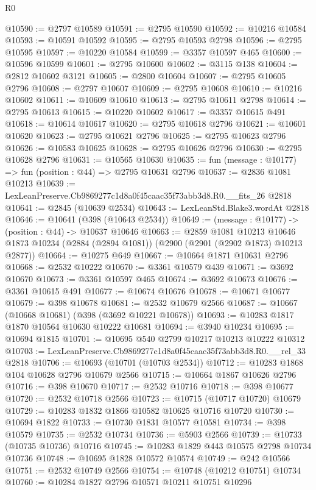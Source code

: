 \begin{lexlean}{R0}
\begin{coremodule}
@10590 := @2797 @10589
@10591 := @2795 @10590
@10592 := @10216 @10584
@10593 := @10591 @10592
@10595 := @2795 @10593 @2798
@10596 := @2795 @10595
@10597 := @10220 @10584
@10599 := @3357 @10597 @465
@10600 := @10596 @10599
@10601 := @2795 @10600
@10602 := @3115 @138
@10604 := @2812 @10602 @3121
@10605 := @2800 @10604
@10607 := @2795 @10605 @2796
@10608 := @2797 @10607
@10609 := @2795 @10608
@10610 := @10216 @10602
@10611 := @10609 @10610
@10613 := @2795 @10611 @2798
@10614 := @2795 @10613
@10615 := @10220 @10602
@10617 := @3357 @10615 @491
@10618 := @10614 @10617
@10620 := @2795 @10618 @2796
@10621 := @10601 @10620
@10623 := @2795 @10621 @2796
@10625 := @2795 @10623 @2796
@10626 := @10583 @10625
@10628 := @2795 @10626 @2796
@10630 := @2795 @10628 @2796
@10631 := @10565 @10630
@10635 := fun (message : @10177) => fun (position : @44) => @2795 @10631 @2796
@10637 := @2836 @1081 @10213
@10639 := LexLeanPreserve.Cb9869277c1d8a0f45caac35f73abb3d8.R0.__fits_26 @2818
@10641 := @2845 (@10639 @2534)
@10643 := LexLeanStd.Blake3.wordAt @2818
@10646 := @10641 (@398 (@10643 @2534))
@10649 := (message : @10177) -> (position : @44) -> @10637 @10646
@10663 := @2859
    @1081
    @10213
    @10646
    @1873
    @10234
    (@2884 (@2894 @1081))
    (@2900 (@2901 (@2902 @1873) @10213 @2877))
@10664 := @10275 @649
@10667 := @10664 @1871 @10631 @2796
@10668 := @2532 @10222
@10670 := @3361 @10579 @439
@10671 := @3692 @10670
@10673 := @3361 @10597 @465
@10674 := @3692 @10673
@10676 := @3361 @10615 @491
@10677 := @10674 @10676
@10678 := @10671 @10677
@10679 := @398 @10678
@10681 := @2532 @10679 @2566
@10687 := @10667 (@10668 @10681) (@398 (@3692 @10221 @10678))
@10693 := @10283 @1817 @1870 @10564 @10630 @10222 @10681
@10694 := @3940 @10234
@10695 := @10694 @1815
@10701 := @10695 @540 @2799 @10217 @10213 @10222 @10312
@10703 := LexLeanPreserve.Cb9869277c1d8a0f45caac35f73abb3d8.R0.__rel_33 @2818
@10706 := @10693 (@10701 (@10703 @2534))
@10712 := @10283 @1868 @104 @10628 @2796 @10679 @2566
@10715 := @10664 @1867 @10626 @2796
@10716 := @398 @10670
@10717 := @2532 @10716
@10718 := @398 @10677
@10720 := @2532 @10718 @2566
@10723 := @10715 (@10717 @10720) @10679
@10729 := @10283 @1832 @1866 @10582 @10625 @10716 @10720
@10730 := @10694 @1822
@10733 := @10730 @1831 @10577 @10581
@10734 := @398 @10579
@10735 := @2532 @10734
@10736 := @5903 @2566
@10739 := @10733 (@10735 @10736) @10716
@10745 := @10283 @1829 @443 @10575 @2798 @10734 @10736
@10748 := @10695 @1828 @10572 @10574
@10749 := @242 @10566
@10751 := @2532 @10749 @2566
@10754 := @10748 (@10212 @10751) @10734
@10760 := @10284 @1827 @2796 @10571 @10211 @10751 @10296

\end{coremodule}
\end{lexlean}
